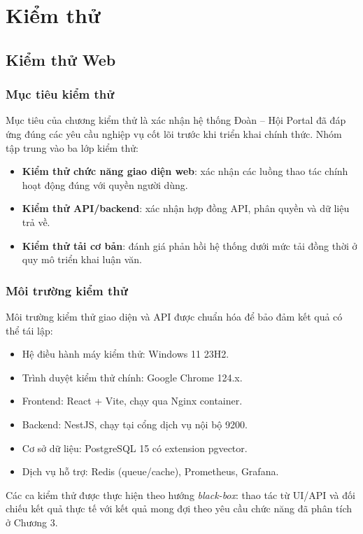 \section{Kiểm thử}

\subsection{Kiểm thử Web}

\subsubsection{Mục tiêu kiểm thử}
Mục tiêu của chương kiểm thử là xác nhận hệ thống Đoàn -- Hội Portal đã đáp ứng đúng các yêu cầu nghiệp vụ cốt lõi trước khi triển khai chính thức. Nhóm tập trung vào ba lớp kiểm thử:
\begin{itemize}
	\item \textbf{Kiểm thử chức năng giao diện web}: xác nhận các luồng thao tác chính hoạt động đúng với quyền người dùng.
	\item \textbf{Kiểm thử API/backend}: xác nhận hợp đồng API, phân quyền và dữ liệu trả về.
	\item \textbf{Kiểm thử tải cơ bản}: đánh giá phản hồi hệ thống dưới mức tải đồng thời ở quy mô triển khai luận văn.
\end{itemize}

\subsubsection{Môi trường kiểm thử}
Môi trường kiểm thử giao diện và API được chuẩn hóa để bảo đảm kết quả có thể tái lập:
\begin{itemize}
	\item Hệ điều hành máy kiểm thử: Windows 11 23H2.
	\item Trình duyệt kiểm thử chính: Google Chrome 124.x.
	\item Frontend: React + Vite, chạy qua Nginx container.
	\item Backend: NestJS, chạy tại cổng dịch vụ nội bộ 9200.
	\item Cơ sở dữ liệu: PostgreSQL 15 có extension pgvector.
	\item Dịch vụ hỗ trợ: Redis (queue/cache), Prometheus, Grafana.
\end{itemize}

Các ca kiểm thử được thực hiện theo hướng \textit{black-box}: thao tác từ UI/API và đối chiếu kết quả thực tế với kết quả mong đợi theo yêu cầu chức năng đã phân tích ở Chương 3.

